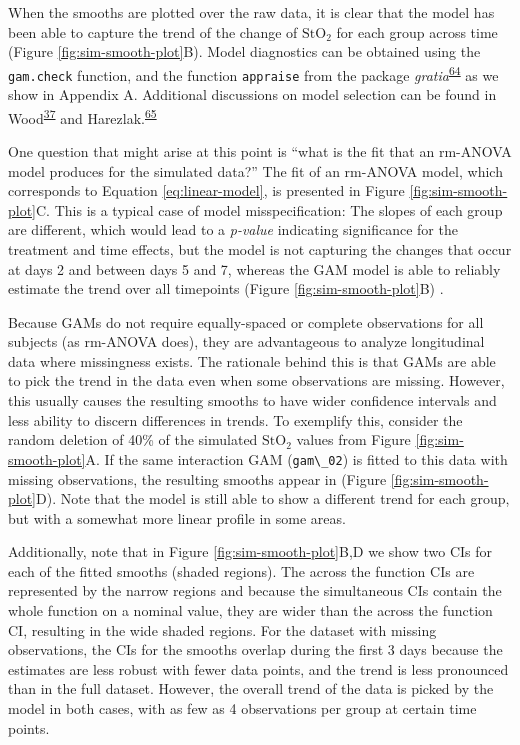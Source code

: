 \documentclass[
]{article}
\newcommand{\passthrough}[1]{#1}
\begin{document}
When the smooths are plotted over the raw data, it is clear that the model has been able to capture the trend of the change of \(\mbox{StO}_2\) for each group across time (Figure \ref{fig:sim-smooth-plot}B). Model diagnostics can be obtained using the \passthrough{\lstinline!gam.check!} function, and the function \passthrough{\lstinline!appraise!} from the package \emph{gratia}\textsuperscript{\protect\hyperlink{ref-gratia}{64}} as we show in Appendix A. Additional discussions on model selection can be found in Wood\textsuperscript{\protect\hyperlink{ref-wood2017}{37}} and Harezlak.\textsuperscript{\protect\hyperlink{ref-harezlak2018}{65}}

One question that might arise at this point is ``what is the fit that an rm-ANOVA model produces for the simulated data?'' The fit of an rm-ANOVA model, which corresponds to Equation \eqref{eq:linear-model}, is presented in Figure \ref{fig:sim-smooth-plot}C. This is a typical case of model misspecification: The slopes of each group are different, which would lead to a \emph{p-value} indicating significance for the treatment and time effects, but the model is not capturing the changes that occur at days 2 and between days 5 and 7, whereas the GAM model is able to reliably estimate the trend over all timepoints (Figure \ref{fig:sim-smooth-plot}B) .

Because GAMs do not require equally-spaced or complete observations for all subjects (as rm-ANOVA does), they are advantageous to analyze longitudinal data where missingness exists. The rationale behind this is that GAMs are able to pick the trend in the data even when some observations are missing. However, this usually causes the resulting smooths to have wider confidence intervals and less ability to discern differences in trends. To exemplify this, consider the random deletion of 40\% of the simulated \(\mbox{StO}_2\) values from Figure \ref{fig:sim-smooth-plot}A. If the same interaction GAM (\passthrough{\lstinline!gam\_02!}) is fitted to this data with missing observations, the resulting smooths appear in (Figure \ref{fig:sim-smooth-plot}D). Note that the model is still able to show a different trend for each group, but with a somewhat more linear profile in some areas.

Additionally, note that in Figure \ref{fig:sim-smooth-plot}B,D we show two CIs for each of the fitted smooths (shaded regions). The across the function CIs are represented by the narrow regions and because the simultaneous CIs contain the whole function on a nominal value, they are wider than the across the function CI, resulting in the wide shaded regions. For the dataset with missing observations, the CIs for the smooths overlap during the first 3 days because the estimates are less robust with fewer data points, and the trend is less pronounced than in the full dataset. However, the overall trend of the data is picked by the model in both cases, with as few as 4 observations per group at certain time points.
\end{document}
